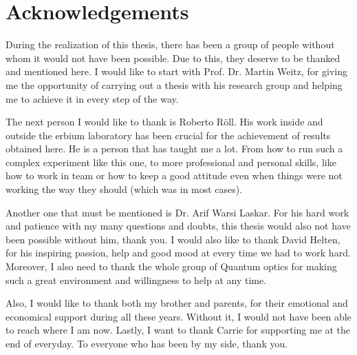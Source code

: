 \chapter{Acknowledgements}
\label{sec:ack}

During the realization of this thesis, there has been a group of people without whom it would not have been possible. Due to this, they deserve to be thanked and mentioned here. I would like to start with Prof. Dr. Martin Weitz, for giving me the opportunity of carrying out a thesis with his research group and helping me to achieve it in every step of the way.

The next person I would like to thank is Roberto R\"oll. His work inside and outside the erbium laboratory has been crucial for the achievement of results obtained here. He is a person that has taught me a lot. From how to run such a complex experiment like this one, to more professional and personal skills, like how to work in team or how to keep a good attitude even when things were not working the way they should (which was in most cases).

Another one that must be mentioned is Dr. Arif Warsi Laskar. For his hard work and patience with my many questions and doubts, this thesis would also not have been possible without him, thank you. I would also like to thank David Helten, for his inspiring passion, help and good mood at every time we had to work hard. Moreover, I also need to thank the whole group of Quantum optics for making such a great environment and willingness to help at any time.

Also, I would like to thank both my brother and parents, for their emotional and economical support during all these years. Without it, I would not have been able to reach where I am now. Lastly, I want to thank Carrie for supporting me at the end of everyday. To everyone who has been by my side, thank you.



